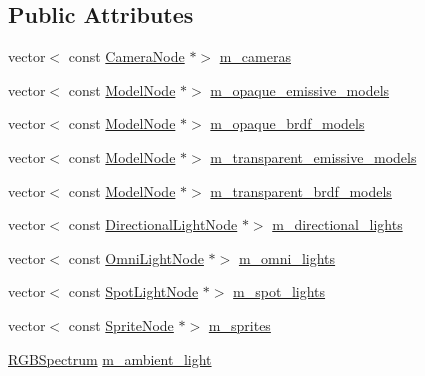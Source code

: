 \subsection*{Public Attributes}
\begin{DoxyCompactItemize}
\item 
vector$<$ const \hyperlink{classmage_1_1_camera_node}{Camera\+Node} $\ast$$>$ \hyperlink{structmage_1_1_pass_buffer_a4885440342be6a2cd11002781704a63f}{m\+\_\+cameras}
\item 
vector$<$ const \hyperlink{classmage_1_1_model_node}{Model\+Node} $\ast$$>$ \hyperlink{structmage_1_1_pass_buffer_a6a2c8f757aca5b28eda0bec25f412e05}{m\+\_\+opaque\+\_\+emissive\+\_\+models}
\item 
vector$<$ const \hyperlink{classmage_1_1_model_node}{Model\+Node} $\ast$$>$ \hyperlink{structmage_1_1_pass_buffer_a7b866f3637755bfb2d951fe8a3495bea}{m\+\_\+opaque\+\_\+brdf\+\_\+models}
\item 
vector$<$ const \hyperlink{classmage_1_1_model_node}{Model\+Node} $\ast$$>$ \hyperlink{structmage_1_1_pass_buffer_a6eeb7390dcdc25022e887ce110ff1fff}{m\+\_\+transparent\+\_\+emissive\+\_\+models}
\item 
vector$<$ const \hyperlink{classmage_1_1_model_node}{Model\+Node} $\ast$$>$ \hyperlink{structmage_1_1_pass_buffer_a2697c5e89c8e654ada78cbf15f5e8067}{m\+\_\+transparent\+\_\+brdf\+\_\+models}
\item 
vector$<$ const \hyperlink{namespacemage_a7637b5351fc0f66a10badd80ebb35899}{Directional\+Light\+Node} $\ast$$>$ \hyperlink{structmage_1_1_pass_buffer_a20f2a4518ea6121e6c9ae0ed9d263435}{m\+\_\+directional\+\_\+lights}
\item 
vector$<$ const \hyperlink{namespacemage_a1724c6e6b6b5ba535cdd967cbbb4a669}{Omni\+Light\+Node} $\ast$$>$ \hyperlink{structmage_1_1_pass_buffer_ab4553bc8afe80eff1f52d511cd23e90b}{m\+\_\+omni\+\_\+lights}
\item 
vector$<$ const \hyperlink{namespacemage_aeed5dee4ff6c591eabb0e9114256df4a}{Spot\+Light\+Node} $\ast$$>$ \hyperlink{structmage_1_1_pass_buffer_a45b9dd8e0ecb9c0110b53a5a744519bb}{m\+\_\+spot\+\_\+lights}
\item 
vector$<$ const \hyperlink{classmage_1_1_sprite_node}{Sprite\+Node} $\ast$$>$ \hyperlink{structmage_1_1_pass_buffer_ad742ad6712a63e9d58621da83a7fb900}{m\+\_\+sprites}
\item 
\hyperlink{structmage_1_1_r_g_b_spectrum}{R\+G\+B\+Spectrum} \hyperlink{structmage_1_1_pass_buffer_a311ad723470aff0ad80c325d9ead07b9}{m\+\_\+ambient\+\_\+light}
$$
\end{DoxyCompactItemize}

